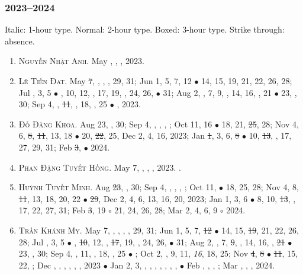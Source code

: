 \documentclass{article}
\begin{document}
\subsubsection{2023--2024}
Italic: 1-hour type. Normal: 2-hour type. Boxed: 3-hour type. Strike through: absence.
\begin{enumerate}
	\item \textsc{Nguyễn Nhật Anh.} {\sf[In]} May , , , 2023. {\sf[Out]}
	\item \textsc{Lê Tiến Đạt.} May \st{7}, , , , 29, 31; Jun 1, 5, 7, 12 $\bullet$ 14, 15, 19, 21, 22, 26, 28; Jul , 3, 5 $\bullet$ , 10, 12, , 17, 19, , 24, 26,  $\bullet$ 31; Aug 2, , 7, 9, , 14, 16, , 21 $\bullet$ 23, , 30; Sep 4, , \st{11}, , 18, , 25 $\bullet$ , 2023. {\sf[Out]}
	\item \textsc{Đỗ Đăng Khoa.} {\sf[In]} Aug 23, , 30; Sep 4, , , , ; Oct 11, 16 $\bullet$ 18, 21, \st{25}, 28; Nov 4, 6, \st{8}, \st{11}, 13, 18 $\bullet$ 20, \st{22}, 25, Dec 2, 4, 16, 2023; Jan \st{1}, 3, 6, \st{8} $\bullet$ 10, \st{13}, , 17, 27, 29, 31; Feb \st{3}, $\bullet$ 2024.
	\item \textsc{Phan Đặng Tuyết Hồng.} May 7, , , , 2023. {}. {\sf[Out]}
	\item \textsc{Huỳnh Tuyết Minh.} {\sf[In]} Aug \st{23}, , 30; Sep 4, , , , ; Oct 11,  $\bullet$ 18, 25, 28; Nov 4, 8, \st{11}, 13, 18, 20, 22 $\bullet$ \st{29}, Dec 2, 4, 6, 13, 16, 20, 2023; Jan 1, 3, 6 $\bullet$ 8, 10, \st{13}, , 17, 22, 27, 31; Feb \st{3}, 19 $\circ$ 21, 24, 26, 28; Mar 2, 4, 6, 9 $\circ$ 2024.
	\item \textsc{Trần Khánh My.} May 7, , , , , 29, 31; Jun 1, 5, 7, \st{12} $\bullet$ 14, 15, \st{19}, 21, 22, 26, 28; Jul , 3, 5 $\bullet$ , \st{10}, 12, , \st{17}, 19, , 24, 26,  $\bullet$ 31; Aug 2, , 7, \st{9}, , 14, 16, , \st{21} $\bullet$ 23, , 30; Sep 4, , 11, , 18, , 25 $\bullet$ ; Oct 2, , 9, 11, {\it16}, 18, 25; Nov \st{4}, \st{8} $\bullet$ \st{11}, 15, 22, ; Dec , , , , , , 2023 $\bullet$ Jan 2, 3, , , , , , , ,  $\bullet$ Feb , , , ; Mar , , , 2024.

\end{enumerate}
\end{document}
